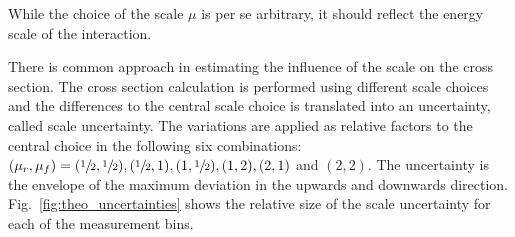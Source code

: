 While the choice of the scale $\mu$ is per se arbitrary, it should reflect the
energy scale of the interaction. 

There is common approach in estimating the influence of the scale on the cross
section. The cross section calculation is performed using different scale
choices and the differences to the central scale choice is translated into an
uncertainty, called scale uncertainty. The variations are applied as relative
factors to the central choice in the following six combinations: $(\mu_r, \mu_f) =
(\sfrac{1}{2}, \sfrac{1}{2}), (\sfrac{1}{2}, 1), (1, \sfrac{1}{2}), (1, 2), (2,
1)$ and $(2, 2)$. The uncertainty is the envelope of the maximum deviation in
the upwards and downwards direction.  Fig.~\ref{fig:theo_uncertainties} shows
the relative size of the scale uncertainty for each of the measurement bins.

